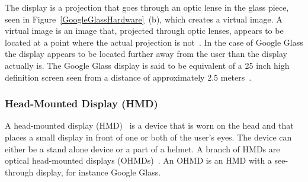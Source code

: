 The display is a projection that goes through an optic lense in the glass piece, seen in Figure~\ref{GoogleGlassHardware}~(b), which creates a virtual image. A virtual image is an image that, projected through optic lenses, appears to be located at a point where the actual projection is not~\cite{virtualImageWiki}. In the case of Google Glass the display appears to be located further away from the user than the display actually is. The Google Glass display is said to be equivalent of a 25 inch high definition screen seen from a distance of approximately 2.5 meters~\cite{GlassSpecs}.

%
%
%
%
%
%
%
%	
%	
%	
%
%
%
%
%
%
%
%
\subsubsection{Head-Mounted Display (HMD)}
\label{subsubsec:hmd}
A head-mounted display (HMD)~\cite{hmdWiki} is a device that is worn on the head and that places a small display in front of one or both of the user's eyes. The device can either be a stand alone device or a part of a helmet. A branch of HMDs are optical head-mounted displays (OHMDs)~\cite{ohmdWiki}. An OHMD is an HMD with a see-through display, for instance Google Glass.

